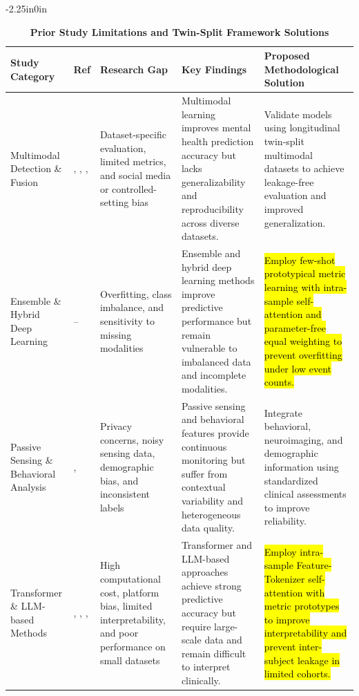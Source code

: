\documentclass[10pt,letterpaper]{article}
\begin{document}
\begin{table}[!t]
\begin{adjustwidth}{-2.25in}{0in}
\centering
\caption{\textbf{Prior Study Limitations and Twin-Split Framework Solutions}}
\label{tab:prior_limitations}
\footnotesize
\renewcommand{\arraystretch}{1.15}

\begin{tabular}{|p{2.8cm}|p{2.0cm}|p{3.8cm}|p{4.5cm}|p{4.8cm}|}
\hline
\textbf{Study Category} & \textbf{Ref} & \textbf{Research Gap} & \textbf{Key Findings} & \textbf{Proposed Methodological Solution} \\
\hline

Multimodal Detection \& Fusion
& \cite{ref1}, \cite{ref2}, \cite{ref3}, \cite{ref4}
& Dataset-specific evaluation, limited metrics, and social media or controlled-setting bias
& Multimodal learning improves mental health prediction accuracy but lacks generalizability and reproducibility across diverse datasets.
& Validate models using longitudinal twin-split multimodal datasets to achieve leakage-free evaluation and improved generalization. \\
\hline

Ensemble \& Hybrid Deep Learning
& \cite{ref5}--\cite{ref8}
& Overfitting, class imbalance, and sensitivity to missing modalities
& Ensemble and hybrid deep learning methods improve predictive performance but remain vulnerable to imbalanced data and incomplete modalities.
& \hl{Employ few-shot prototypical metric learning with intra-sample self-attention and parameter-free equal weighting to prevent overfitting under low event counts.} \\
\hline

Passive Sensing \& Behavioral Analysis
& \cite{ref9}, \cite{ref12}
& Privacy concerns, noisy sensing data, demographic bias, and inconsistent labels
& Passive sensing and behavioral features provide continuous monitoring but suffer from contextual variability and heterogeneous data quality.
& Integrate behavioral, neuroimaging, and demographic information using standardized clinical assessments to improve reliability. \\
\hline

Transformer \& LLM-based Methods
& \cite{ref16}, \cite{ref17}, \cite{ref20}, \cite{ref21}
& High computational cost, platform bias, limited interpretability, and poor performance on small datasets
& Transformer and LLM-based approaches achieve strong predictive accuracy but require large-scale data and remain difficult to interpret clinically.
& \hl{Employ intra-sample Feature-Tokenizer self-attention with metric prototypes to improve interpretability and prevent inter-subject leakage in limited cohorts.} \\
\hline


\end{tabular}
\end{adjustwidth}
\end{table}
\end{document}
